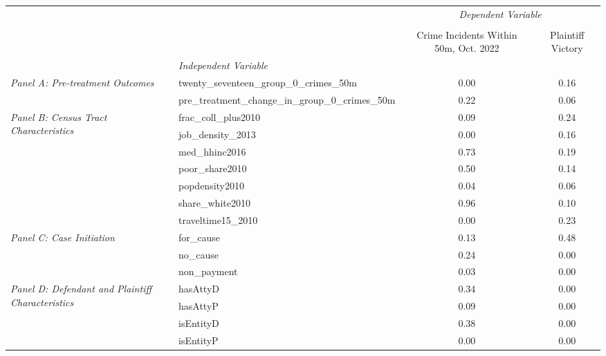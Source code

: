\begin{tabular}{llcc}
\toprule
 &  & \multicolumn{2}{c}{\textit{Dependent Variable}} \\
\cline{3-4}
\\
 &  & Crime Incidents Within 50m, Oct. 2022 & Plaintiff Victory \\
 & \emph{Independent Variable} &  &  \\
\midrule
\multirow[c]{2}{3cm}{\textit{Panel A: Pre-treatment Outcomes}} & twenty_seventeen_group_0_crimes_50m & 0.00 & 0.16 \\
 & pre_treatment_change_in_group_0_crimes_50m & 0.22 & 0.06 \\
\cline{1-4}
\multirow[c]{7}{3cm}{\textit{Panel B: Census Tract Characteristics}} & frac_coll_plus2010 & 0.09 & 0.24 \\
 & job_density_2013 & 0.00 & 0.16 \\
 & med_hhinc2016 & 0.73 & 0.19 \\
 & poor_share2010 & 0.50 & 0.14 \\
 & popdensity2010 & 0.04 & 0.06 \\
 & share_white2010 & 0.96 & 0.10 \\
 & traveltime15_2010 & 0.00 & 0.23 \\
\cline{1-4}
\multirow[c]{3}{3cm}{\textit{Panel C: Case Initiation}} & for_cause & 0.13 & 0.48 \\
 & no_cause & 0.24 & 0.00 \\
 & non_payment & 0.03 & 0.00 \\
\cline{1-4}
\multirow[c]{4}{3cm}{\textit{Panel D: Defendant and Plaintiff Characteristics}} & hasAttyD & 0.34 & 0.00 \\
 & hasAttyP & 0.09 & 0.00 \\
 & isEntityD & 0.38 & 0.00 \\
 & isEntityP & 0.00 & 0.00 \\
\cline{1-4}
\bottomrule
\end{tabular}
